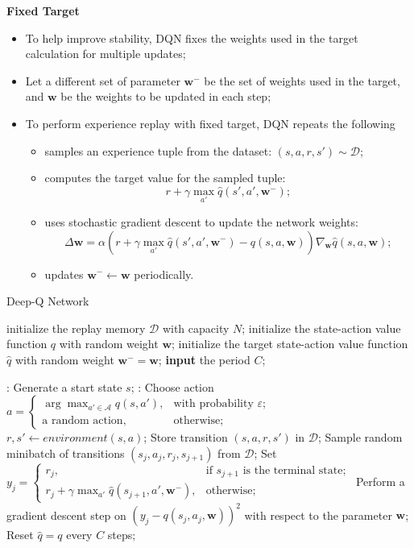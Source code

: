 \documentclass{progartcn}
\begin{document}
		\textbf{Fixed Target}
		\begin{itemize}[noitemsep,topsep=0pt]
			\item To help improve stability, DQN fixes the weights used in the target calculation for multiple updates;
			\item Let a different set of parameter $\bm{w}^−$ be the set of weights used in the target, and $\bm{w}$ be the weights to be updated in each step;
			\item To perform experience replay with fixed target, DQN repeats the following
			\begin{itemize}[noitemsep,topsep=0pt]
				\item samples an experience tuple from the dataset: $(s,a,r,s') \sim \mathcal{D}$;
				\item computes the target value for the sampled tuple:
				\[r+\gamma\max_{a'}\hat{q}(s',a',\bm{w}^-);\]
				\item uses stochastic gradient descent to update the network weights:
				\[\Delta\bm{w}=\alpha(r+\gamma\max_{a'}\hat{q}(s',a',\bm{w}^-)-q(s,a,\bm{w}))\nabla_{\bm{w}}\hat{q}(s,a,\bm{w});\]
				\item updates $\bm{w}^-\gets\bm{w}$ periodically.
			\end{itemize}
		\end{itemize}

		\begin{algorithm}[h]
				\caption{Deep-Q Network}
				\label{alg: Deep-Q Network}
				\begin{algorithmic}[1]
					\State initialize the replay memory $\mathcal{D}$ with capacity $N$; initialize the state-action value function $q$ with random weight $\bm{w}$; initialize the target state-action value function $\hat q$ with random weight $\bm{w}^-=\bm{w}$;
		            \State \textbf{input} the period $C$;

		            :
		            	\State Generate a start state $s$;
		            	:
		            		\State Choose action $a=\begin{cases}\arg\max_{a'\in\mathcal{A}}q(s,a'), & \text{with probability } \varepsilon;\\ \text{a random action}, & \text{otherwise};\end{cases}$
		            		\State $r,s'\gets environment(s,a)$;
		            		\State Store transition $(s,a,r,s')$ in $\mathcal{D}$;
		            		\State Sample random minibatch of transitions $(s_j,a_j,r_j,s_{j+1})$ from $\mathcal{D}$;
		            		\State Set $y_j=\begin{cases}r_j, &\text{if }s_{j+1}\text{ is the terminal state};\\ r_j+\gamma\max_{a'}\hat{q}(s_{j+1},a',\bm{w}^-), &\text{otherwise};\end{cases}$
		            		\State Perform a gradient descent step on $\left(y_j-q(s_j,a_j,\bm{w})\right)^2$ with respect to the parameter $\bm{w}$;
		            		\State Reset $\hat{q}=q$ every $C$ steps;
		            	\EndWhile
		            \EndFor
		        \end{algorithmic}
		        \end{algorithm}
\end{document}
